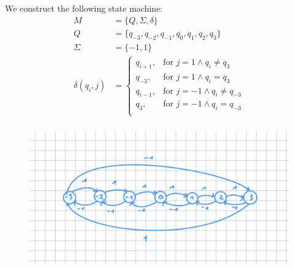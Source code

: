 \documentclass[a4paper,12pt,numbers=noenddot]{scrreport}
\begin{document}
\section{}
We construct the following state machine:
\begin{align*}
    M & = \{Q, \Sigma, \delta\} \\
    Q  & = \{q_{-3}, q_{-2}, q_{-1}, q_0, q_1, q_2, q_3\} \\
    \Sigma & = \{-1, 1\} \\
    \delta(q_i,j) & = 
        \begin{cases}
            q_{i+1},  & \text{for } j = 1 \land q_i \neq q_3\\
            q_{-3},   & \text{for } j = 1 \land q_i = q_{3}\\
            q_{i-1},  & \text{for } j = -1 \land q_i \neq q_{-3}\\
            q_3,      & \text{for } j = -1 \land q_i = q_{-3}\\
        \end{cases}
\end{align*}

\begin{figure}[h]
    \centering
    \includegraphics[scale=0.65]{03-automata.png}
\end{figure}
\end{document}
